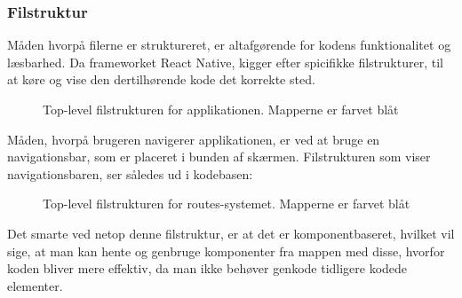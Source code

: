\subsubsection{Filstruktur}

Måden hvorpå filerne er struktureret, er altafgørende for kodens funktionalitet og læsbarhed. Da frameworket React Native, kigger efter spicifikke filstrukturer, til at køre og vise den dertilhørende kode det korrekte sted.
\begin{figure}[H]
    \caption{Top-level filstrukturen for applikationen. Mapperne er farvet blåt}
    \label{fig:tlprojstruct}
\end{figure}

Måden, hvorpå brugeren navigerer applikationen, er ved at bruge en navigationsbar, som er placeret i bunden af skærmen. 
Filstrukturen som viser navigationsbaren, ser således ud i kodebasen:
\begin{figure}[H]
    \caption{Top-level filstrukturen for routes-systemet. Mapperne er farvet blåt}
    \label{fig:tlprojstruct}
\end{figure}

Det smarte ved netop denne filstruktur, er at det er komponentbaseret, hvilket vil sige, at man kan hente og genbruge komponenter fra mappen med disse, hvorfor koden bliver mere effektiv, da man ikke behøver genkode tidligere kodede elementer. 

